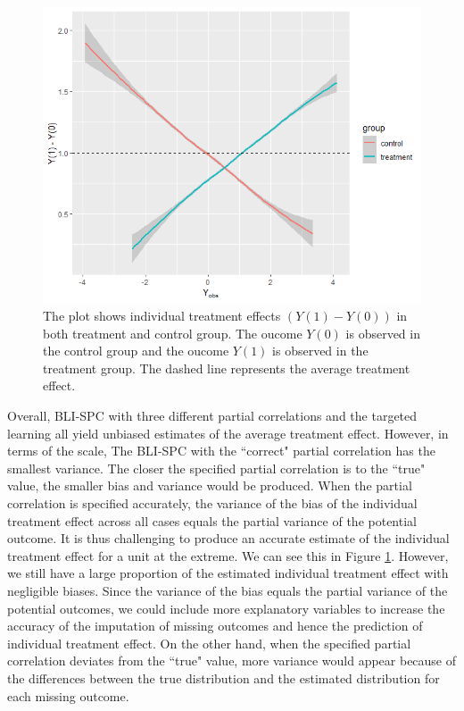 	\begin{figure}[ht!]
		\centering
		\includegraphics[width=1.0\linewidth,height=0.5\textheight]{plots/plot4.5} 
		\caption{The plot shows individual treatment effects $(Y(1) - Y(0))$ in both treatment and control group. The oucome $Y(0)$ is observed in the control group and the oucome $Y(1)$ is observed in the treatment group. The dashed line represents the average treatment effect.}
		\label{fig4_2}
	\end{figure}
	
	Overall, BLI-SPC with three different partial correlations and the targeted learning all yield unbiased estimates of the average treatment effect. However, in terms of the scale, The BLI-SPC with the ``correct" partial correlation has the smallest variance. The closer the specified partial correlation is to the ``true" value, the smaller bias and variance would be produced. When the partial correlation is specified accurately, the variance of the bias of the individual treatment effect across all cases equals the partial variance of the potential outcome. It is thus challenging to produce an accurate estimate of the individual treatment effect for a unit at the extreme. We can see this in Figure \ref{fig4_2}. However, we still have a large proportion of the estimated individual treatment effect with negligible biases. Since the variance of the bias equals the partial variance of the potential outcomes, we could include more explanatory variables to increase the accuracy of the imputation of missing outcomes and hence the prediction of individual treatment effect. On the other hand, when the specified partial correlation deviates from the ``true" value, more variance would appear because of the differences between the true distribution and the estimated distribution for each missing outcome. 
	
